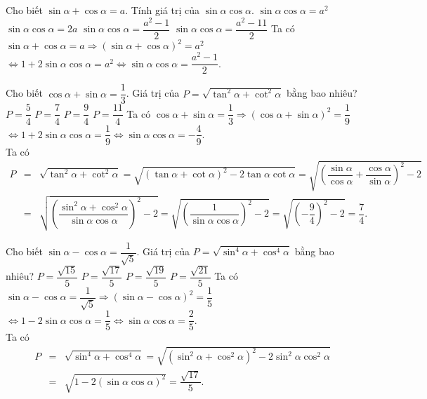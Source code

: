 \begin{ex}%
	Cho biết $\sin \alpha +\cos \alpha =a$. Tính giá trị của $\sin \alpha \cos \alpha $.
	\choice
	{$\sin \alpha \cos \alpha =a^2$}
	{$\sin \alpha \cos \alpha =2a$}
	{\True $\sin \alpha \cos \alpha =\dfrac{a^2-1}{2}$}
	{$\sin \alpha \cos \alpha =\dfrac{a^2-11}{2}$}
	\loigiai
	{Ta có $\sin \alpha +\cos \alpha =a\Rightarrow {{(\sin \alpha +\cos \alpha )}^2}=a^2$\\
		$\Leftrightarrow 1+2\sin \alpha \cos \alpha =a^2\Leftrightarrow \sin \alpha \cos \alpha =\dfrac{a^2-1}{2}$.}
\end{ex}
\begin{ex}%
	Cho biết $\cos \alpha +\sin \alpha =\dfrac{1}{3}$. Giá trị của $P=\sqrt{\tan^2\alpha +\cot^2\alpha }$ bằng bao nhiêu?
	\choice
	{$P=\dfrac{5}{4}$}
	{\True $P=\dfrac{7}{4}$}
	{$P=\dfrac{9}{4}$}
	{$P=\dfrac{11}{4}$}
	\loigiai
	{Ta có $\cos \alpha +\sin \alpha =\dfrac{1}{3}\Rightarrow (\cos \alpha +\sin \alpha )^2=\dfrac{1}{9}$\\
		$\Leftrightarrow 1+2\sin \alpha \cos \alpha =\dfrac{1}{9}\Leftrightarrow \sin \alpha \cos \alpha =-\dfrac{4}{9}$.\\
		Ta có \begin{eqnarray*}
			P&=&\sqrt{\tan^2\alpha +\cot^2\alpha }=\sqrt{(\tan \alpha +\cot \alpha )^2-2\tan \alpha \cot \alpha }=\sqrt{\left(\dfrac{\sin \alpha }{\cos \alpha }+\dfrac{\cos \alpha }{\sin \alpha }\right)^2-2}\\
			&=&\sqrt{\left(\dfrac{\sin ^2\alpha +\cos^2\alpha }{\sin \alpha \cos \alpha } \right)^2-2}=\sqrt{\left(\dfrac{1}{\sin \alpha \cos \alpha } \right)^2-2}=\sqrt{\left(-\dfrac{9}{4} \right)^2-2}=\dfrac{7}{4}.
	\end{eqnarray*}}
\end{ex}
\begin{ex}%
	Cho biết $\sin \alpha -\cos \alpha =\dfrac{1}{\sqrt{5}}$. Giá trị của $P=\sqrt{{\sin ^4}\alpha +{\cos ^4}\alpha }$ bằng bao nhiêu?
	\choice
	{$P=\dfrac{\sqrt{15}}{5}$}
	{\True $P=\dfrac{\sqrt{17}}{5}$}
	{$P=\dfrac{\sqrt{19}}{5}$}
	{$P=\dfrac{\sqrt{21}}{5}$}
	\loigiai
	{Ta có $\sin \alpha -\cos \alpha =\dfrac{1}{\sqrt{5}}\Rightarrow {{(\sin \alpha -\cos \alpha )}^2}=\dfrac{1}{5}$\\
		$\Leftrightarrow 1-2\sin \alpha \cos \alpha =\dfrac{1}{5}\Leftrightarrow \sin \alpha \cos \alpha =\dfrac{2}{5}$.\\
		Ta có \begin{eqnarray*}
			P&=&\sqrt{{\sin ^4}\alpha +{\cos ^4}\alpha }=\sqrt{(\sin ^2\alpha +\cos^2\alpha )^2-2\sin ^2\alpha \cos^2\alpha }\\
			&=&\sqrt{1-2(\sin \alpha \cos\alpha )^2}=\dfrac{\sqrt{17}}{5}.
	\end{eqnarray*}}
\end{ex}
